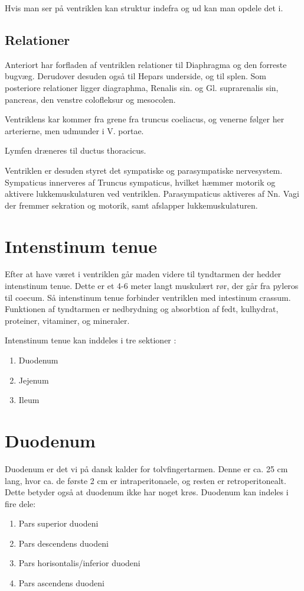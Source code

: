	
	Hvis man ser på ventriklen kan struktur indefra og ud kan man opdele det i. 
	
	\subsection{Relationer}
	
	Anteriort har forfladen af ventriklen relationer til Diaphragma og den forreste bugvæg. Derudover desuden også til Hepars underside, og til splen. Som posteriore relationer ligger diagraphma, Renalis sin. og Gl. suprarenalis sin, pancreas, den venstre colofleksur og mesocolen.
	
	Ventriklens kar kommer fra grene fra truncus coeliacus, og venerne følger her arterierne, men udmunder i V. portae.
	
	Lymfen dræneres til ductus thoracicus.
	
	Ventriklen er desuden styret det sympatiske og parasympatiske nervesystem. Sympaticus innerveres af Truncus sympaticus, hvilket hæmmer motorik og aktivere lukkemuskulaturen ved ventriklen. Parasympaticus aktiveres af Nn. Vagi der fremmer sekration og motorik, samt afslapper lukkemuskulaturen. 
	
	
	\section{Intenstinum tenue}
	Efter at have været i ventriklen går maden videre til tyndtarmen der hedder intenstinum tenue. Dette er et 4-6 meter langt muskulært rør, der går fra pyleros til coecum. Så intenstinum tenue forbinder ventriklen med intestinum crassum. Funktionen af tyndtarmen er nedbrydning og absorbtion af fedt, kulhydrat, proteiner, vitaminer, og mineraler. 
	
	Intenstinum tenue kan inddeles i tre sektioner :
	
	\begin{enumerate}
		\item Duodenum
		\item Jejenum
		\item Ileum
	\end{enumerate}
	
	
	\section{Duodenum}
	Duodenum er det vi på dansk kalder for tolvfingertarmen. Denne er ca. 25 cm lang, hvor ca. de første 2 cm er intraperitonaele, og resten er retroperitonealt. Dette betyder også at duodenum ikke har noget krøs. Duodenum kan indeles i fire dele:
	\begin{enumerate}
		\item Pars superior duodeni
		\item Pars descendens duodeni
		\item Pars horisontalis/inferior duodeni
		\item Pars ascendens duodeni
	\end{enumerate}
	
